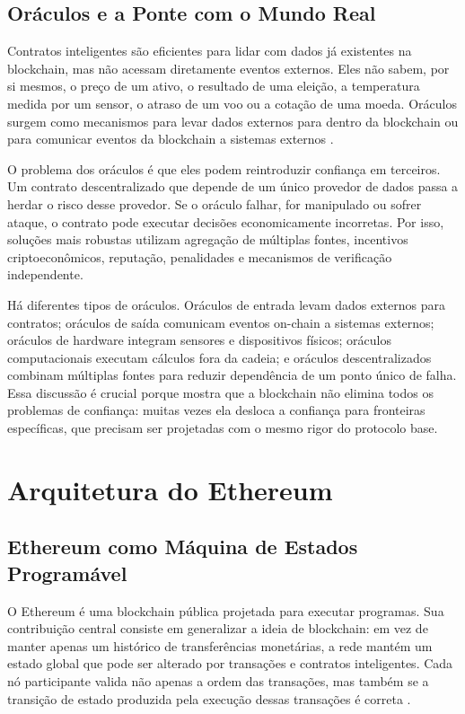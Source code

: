 \documentclass[12pt,a4paper]{report}
\begin{document}
\section{Oráculos e a Ponte com o Mundo Real}

Contratos inteligentes são eficientes para lidar com dados já existentes na blockchain, mas não acessam diretamente eventos externos. Eles não sabem, por si mesmos, o preço de um ativo, o resultado de uma eleição, a temperatura medida por um sensor, o atraso de um voo ou a cotação de uma moeda. Oráculos surgem como mecanismos para levar dados externos para dentro da blockchain ou para comunicar eventos da blockchain a sistemas externos \cite{Bashir2023}.

O problema dos oráculos é que eles podem reintroduzir confiança em terceiros. Um contrato descentralizado que depende de um único provedor de dados passa a herdar o risco desse provedor. Se o oráculo falhar, for manipulado ou sofrer ataque, o contrato pode executar decisões economicamente incorretas. Por isso, soluções mais robustas utilizam agregação de múltiplas fontes, incentivos criptoeconômicos, reputação, penalidades e mecanismos de verificação independente.

Há diferentes tipos de oráculos. Oráculos de entrada levam dados externos para contratos; oráculos de saída comunicam eventos on-chain a sistemas externos; oráculos de hardware integram sensores e dispositivos físicos; oráculos computacionais executam cálculos fora da cadeia; e oráculos descentralizados combinam múltiplas fontes para reduzir dependência de um ponto único de falha. Essa discussão é crucial porque mostra que a blockchain não elimina todos os problemas de confiança: muitas vezes ela desloca a confiança para fronteiras específicas, que precisam ser projetadas com o mesmo rigor do protocolo base.

\chapter{Arquitetura do Ethereum}

\section{Ethereum como Máquina de Estados Programável}

O Ethereum é uma blockchain pública projetada para executar programas. Sua contribuição central consiste em generalizar a ideia de blockchain: em vez de manter apenas um histórico de transferências monetárias, a rede mantém um estado global que pode ser alterado por transações e contratos inteligentes. Cada nó participante valida não apenas a ordem das transações, mas também se a transição de estado produzida pela execução dessas transações é correta \cite{Bashir2023}.
\end{document}
